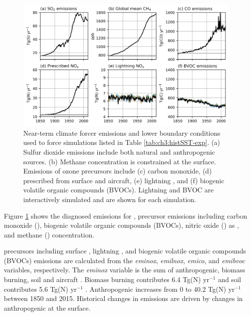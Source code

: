 \begin{figure}
    \centering
    \includegraphics[width=\linewidth]{Chapter3/Figs/f01_emissions.png}
    \caption[Near-term climate forcer emissions and lower boundary conditions used to force AerChemMIP histSST simulations]{Near-term climate forcer emissions and lower boundary conditions used to force simulations listed in Table \ref{tab:ch3:histSST-exp}. (a) Sulfur dioxide emissions include both natural and anthropogenic sources. (b) Methane concentration is constrained at the surface. Emissions of ozone precursors include (c) carbon monoxide, (d) prescribed  from surface and aircraft, (e) lightning , and (f) biogenic volatile organic compounds (BVOCs). Lightning   and BVOC are interactively simulated and are shown for each simulation.}
    \label{fig:ch3:emissions}
\end{figure}

Figure \ref{fig:ch3:emissions} shows the diagnosed emissions for ,  precursor emissions including carbon monoxide (), biogenic volatile organic compounds (BVOCs), nitric oxide () as , and methane () concentration. 

 precursors including surface , lightning ,  and biogenic volatile organic compounds (BVOCs) emissions are calculated from the \textit{eminox}, \textit{emilnox}, \textit{emico}, and \textit{emibvoc} variables, respectively. The \textit{eminox} variable is the sum of anthropogenic, biomass burning, soil and aircraft . Biomass burning contributes 6.4 Tg(N) yr$^{-1}$ and soil contributes 5.6 Tg(N) yr$^{-1}$ \citep{archibaldDescriptionEvaluationUKCA2020}. Anthropogenic  increases from 0 to 40.2 Tg(N) yr$^{-1}$ between 1850 and 2015. Historical changes in  emissions are driven by changes in anthropogenic  at the surface. 

